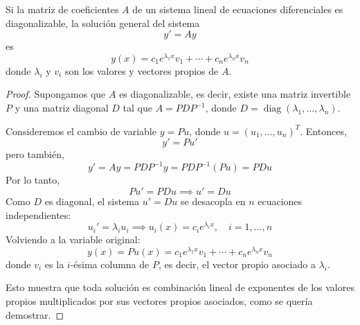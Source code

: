 \begin{theorem}
Si la matriz de coeficientes $A$ de un sistema lineal de ecuaciones diferenciales es diagonalizable, la solución general del sistema
\[
y' = Ay
\]
es
\[
y(x) = c_1 e^{\lambda_1 x} v_1 + \cdots + c_n e^{\lambda_n x} v_n
\]
donde $\lambda_i$ y $v_i$ son los valores y vectores propios de $A$.
\end{theorem}

\begin{proof}
Supongamos que $A$ es diagonalizable, es decir, existe una matriz invertible $P$ y una matriz diagonal $D$ tal que $A = P D P^{-1}$, donde $D = \operatorname{diag}(\lambda_1, \dots, \lambda_n)$.

Consideremos el cambio de variable $y = P u$, donde $u = (u_1, \dots, u_n)^T$. Entonces,
\[
y' = P u'
\]
pero también,
\[
y' = A y = P D P^{-1} y = P D P^{-1} (P u) = P D u
\]
Por lo tanto,
\[
P u' = P D u \implies u' = D u
\]
Como $D$ es diagonal, el sistema $u' = D u$ se desacopla en $n$ ecuaciones independientes:
\[
u_i' = \lambda_i u_i \implies u_i(x) = c_i e^{\lambda_i x}, \quad i = 1, \dots, n
\]
Volviendo a la variable original:
\[
y(x) = P u(x) = c_1 e^{\lambda_1 x} v_1 + \cdots + c_n e^{\lambda_n x} v_n
\]
donde $v_i$ es la $i$-ésima columna de $P$, es decir, el vector propio asociado a $\lambda_i$.

Esto muestra que toda solución es combinación lineal de exponentes de los valores propios multiplicados por sus vectores propios asociados, como se quería demostrar.
\end{proof}


